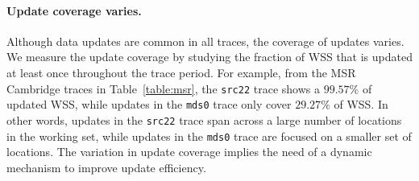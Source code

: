 \paragraph{Update coverage varies.} Although data updates are common in all
traces, the coverage of updates varies. %
We measure the update coverage by studying the fraction of WSS that is updated
at least once throughout the trace period. For example, from the MSR Cambridge
traces in Table~\ref{table:msr}, the \texttt{src22} trace shows a $99.57\%$ of
updated WSS, while updates in the \texttt{mds0} trace only cover $29.27\%$ of
WSS. In other words, updates in the \texttt{src22} trace span across a large
number of locations in the working set, while updates in the \texttt{mds0}
trace are focused on a smaller set of locations.  The variation in update
coverage implies the need of a dynamic mechanism to improve update efficiency.


